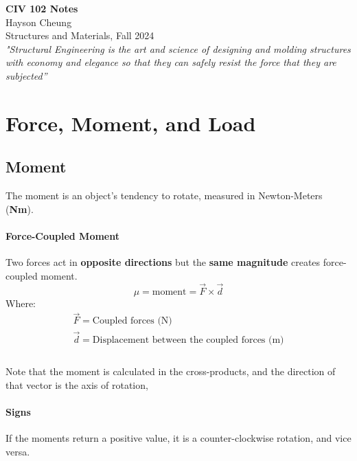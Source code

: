 


\thispagestyle{empty}
\begin{center}
{\LARGE \bf CIV 102 Notes}\\
{\large Hayson Cheung}\\
Structures and Materials, Fall 2024\\
\vspace{10pt}
\textit{"Structural Engineering is the art and science of designing and molding structures with economy and elegance so that they can safely resist the force that they are subjected''}
\end{center}
\section{Force, Moment, and Load} 
\subsection{Moment}
\begin{definition}[Moment]
    The moment is an object's tendency to rotate, measured in Newton-Meters (\textbf{Nm}).
\end{definition}
\begin{shaded}
    \paragraph{Force-Coupled Moment} Two forces act in \textbf{opposite directions} but the \textbf{same magnitude} creates force-coupled moment.
    \begin{equation}
        \mu = \mathrm{moment} = \Vec{F}\times\Vec{d}
    \end{equation}
    Where:
    \begin{equation*}
    \begin{split}
    \Vec{F} = \text{Coupled forces (N)} \\
    \Vec{d} = \text{Displacement between the coupled forces (m)} \\
    \end{split}
    \end{equation*}
    \\Note that the moment is calculated in the cross-products, and the direction of that vector is the axis of rotation,
    \end{shaded}
\paragraph{Signs} If the moments return a positive value, it is a counter-clockwise rotation, and vice versa. 
